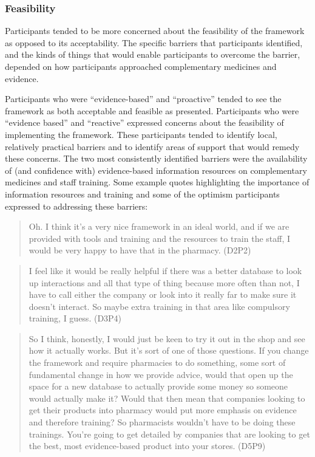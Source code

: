 \documentclass[11pt,a4paper]{article}
\begin{document}
\subsubsection{Feasibility}\label{feasibility}

Participants tended to be more concerned about the feasibility of the
framework as opposed to its acceptability. The specific barriers that
participants identified, and the kinds of things that would enable
participants to overcome the barrier, depended on how participants
approached complementary medicines and evidence.

Participants who were ``evidence-based'' and ``proactive'' tended to see
the framework as both acceptable and feasible as presented. Participants
who were ``evidence based'' and ``reactive'' expressed concerns about
the feasibility of implementing the framework. These participants tended
to identify local, relatively practical barriers and to identify areas
of support that would remedy these concerns. The two most consistently
identified barriers were the availability of (and confidence with)
evidence-based information resources on complementary medicines and
staff training. Some example quotes highlighting the importance of
information resources and training and some of the optimism participants
expressed to addressing these barriers:

\begin{quote}
Oh. I think it's a very nice framework in an ideal world, and if we are
provided with tools and training and the resources to train the staff, I
would be very happy to have that in the pharmacy. (D2P2)
\end{quote}

\begin{quote}
I feel like it would be really helpful if there was a better database to
look up interactions and all that type of thing because more often than
not, I have to call either the company or look into it really far to
make sure it doesn't interact. So maybe extra training in that area like
compulsory training, I guess. (D3P4)
\end{quote}

\begin{quote}
So I think, honestly, I would just be keen to try it out in the shop and
see how it actually works. But it's sort of one of those questions. If
you change the framework and require pharmacies to do something, some
sort of fundamental change in how we provide advice, would that open up
the space for a new database to actually provide some money so someone
would actually make it? Would that then mean that companies looking to
get their products into pharmacy would put more emphasis on evidence and
therefore training? So pharmacists wouldn't have to be doing these
trainings. You're going to get detailed by companies that are looking to
get the best, most evidence-based product into your stores. (D5P9)
\end{quote}
\end{document}

